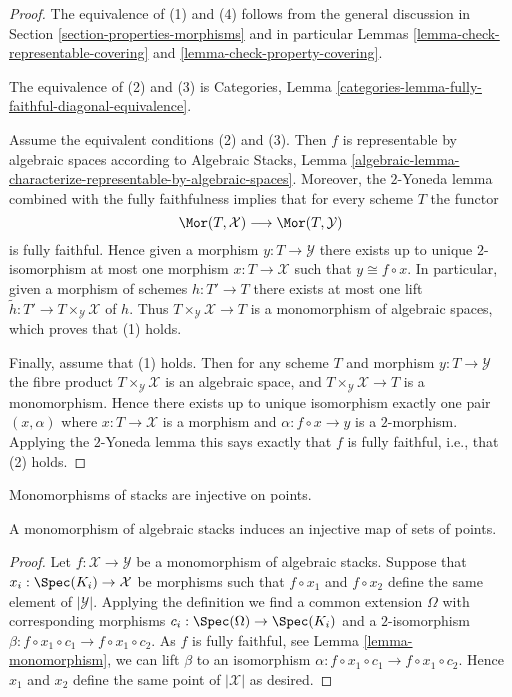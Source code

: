 \begin{proof}
The equivalence of (1) and (4) follows from the general discussion in
Section \ref{section-properties-morphisms}
and in particular
Lemmas \ref{lemma-check-representable-covering} and
\ref{lemma-check-property-covering}.

\medskip\noindent
The equivalence of (2) and (3) is
Categories, Lemma \ref{categories-lemma-fully-faithful-diagonal-equivalence}.

\medskip\noindent
Assume the equivalent conditions (2) and (3). Then $f$ is representable
by algebraic spaces according to
Algebraic Stacks,
Lemma \ref{algebraic-lemma-characterize-representable-by-algebraic-spaces}.
Moreover, the $2$-Yoneda lemma combined with the fully faithfulness
implies that for every scheme $T$ the functor
$$
\Mor(T, \mathcal{X})
\longrightarrow
\Mor(T, \mathcal{Y})
$$
is fully faithful. Hence given a morphism $y : T \to \mathcal{Y}$ there exists
up to unique $2$-isomorphism at most one morphism $x : T \to \mathcal{X}$
such that $y \cong f \circ x$. In particular, given a morphism of schemes
$h : T' \to T$ there exists at most one lift
$\tilde h : T' \to T \times_\mathcal{Y} \mathcal{X}$ of $h$.
Thus $T \times_\mathcal{Y} \mathcal{X} \to T$ is a monomorphism of
algebraic spaces, which proves that (1) holds.

\medskip\noindent
Finally, assume that (1) holds. Then for any scheme $T$ and morphism
$y : T \to \mathcal{Y}$ the fibre product $T \times_\mathcal{Y} \mathcal{X}$
is an algebraic space, and $T \times_\mathcal{Y} \mathcal{X} \to T$
is a monomorphism. Hence there exists up to unique isomorphism
exactly one pair $(x, \alpha)$ where $x : T \to \mathcal{X}$ is a morphism
and $\alpha : f \circ x \to y$ is a $2$-morphism. Applying
the $2$-Yoneda lemma this says exactly that $f$ is fully faithful, i.e.,
that (2) holds.
\end{proof}

\begin{lemma}
\label{lemma-monomorphism-injective-points}
\begin{slogan}
Monomorphisms of stacks are injective on points.
\end{slogan}
A monomorphism of algebraic stacks induces an injective map of
sets of points.
\end{lemma}

\begin{proof}
Let $f : \mathcal{X} \to \mathcal{Y}$ be a monomorphism of algebraic stacks.
Suppose that $x_i : \Spec(K_i) \to \mathcal{X}$ be morphisms such that
$f \circ x_1$ and $f \circ x_2$ define the same element of $|\mathcal{Y}|$.
Applying the definition we find a common extension $\Omega$ with corresponding
morphisms $c_i : \Spec(\Omega) \to \Spec(K_i)$ and a
$2$-isomorphism $\beta : f \circ x_1 \circ c_1 \to f \circ x_1 \circ c_2$.
As $f$ is fully faithful, see
Lemma \ref{lemma-monomorphism},
we can lift $\beta$ to an isomorphism
$\alpha : f \circ x_1 \circ c_1 \to f \circ x_1 \circ c_2$.
Hence $x_1$ and $x_2$ define the same point of $|\mathcal{X}|$
as desired.
\end{proof}

